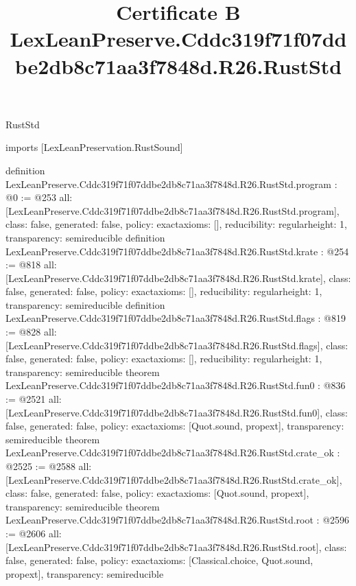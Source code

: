 \begin{lexlean}{RustStd}
\title{Certificate B LexLeanPreserve.Cddc319f71f07ddbe2db8c71aa3f7848d.R26.RustStd}
\begin{coremodule}
imports [LexLeanPreservation.RustSound]

definition LexLeanPreserve.Cddc319f71f07ddbe2db8c71aa3f7848d.R26.RustStd.program : @0 := @253 {
  all: [LexLeanPreserve.Cddc319f71f07ddbe2db8c71aa3f7848d.R26.RustStd.program],
  class: false,
  generated: false,
  policy: exact{axioms: []},
  reducibility: regular{height: 1},
  transparency: semireducible
}
definition LexLeanPreserve.Cddc319f71f07ddbe2db8c71aa3f7848d.R26.RustStd.krate : @254 := @818 {
  all: [LexLeanPreserve.Cddc319f71f07ddbe2db8c71aa3f7848d.R26.RustStd.krate],
  class: false,
  generated: false,
  policy: exact{axioms: []},
  reducibility: regular{height: 1},
  transparency: semireducible
}
definition LexLeanPreserve.Cddc319f71f07ddbe2db8c71aa3f7848d.R26.RustStd.flags : @819 := @828 {
  all: [LexLeanPreserve.Cddc319f71f07ddbe2db8c71aa3f7848d.R26.RustStd.flags],
  class: false,
  generated: false,
  policy: exact{axioms: []},
  reducibility: regular{height: 1},
  transparency: semireducible
}
theorem LexLeanPreserve.Cddc319f71f07ddbe2db8c71aa3f7848d.R26.RustStd.fun0 : @836 := @2521 {
  all: [LexLeanPreserve.Cddc319f71f07ddbe2db8c71aa3f7848d.R26.RustStd.fun0],
  class: false,
  generated: false,
  policy: exact{axioms: [Quot.sound, propext]},
  transparency: semireducible
}
theorem LexLeanPreserve.Cddc319f71f07ddbe2db8c71aa3f7848d.R26.RustStd.crate_ok : @2525 := @2588 {
  all: [LexLeanPreserve.Cddc319f71f07ddbe2db8c71aa3f7848d.R26.RustStd.crate_ok],
  class: false,
  generated: false,
  policy: exact{axioms: [Quot.sound, propext]},
  transparency: semireducible
}
theorem LexLeanPreserve.Cddc319f71f07ddbe2db8c71aa3f7848d.R26.RustStd.root : @2596 := @2606 {
  all: [LexLeanPreserve.Cddc319f71f07ddbe2db8c71aa3f7848d.R26.RustStd.root],
  class: false,
  generated: false,
  policy: exact{axioms: [Classical.choice, Quot.sound, propext]},
  transparency: semireducible
}


\end{coremodule}
\end{lexlean}
